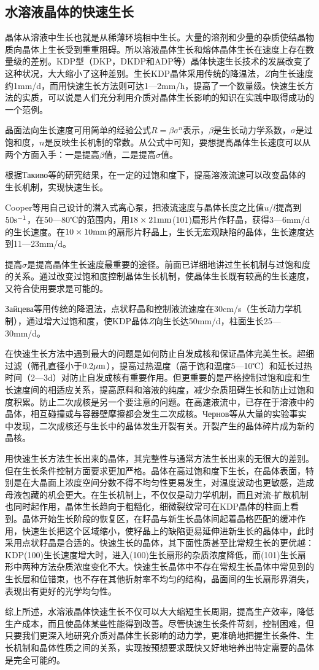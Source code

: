 \subsection{水溶液晶体的快速生长}
晶体从溶液中生长也就是从稀薄环境相中生长。大量的溶剂和少量的杂质使结晶物质向晶体上生长受到重重阻碍。所以溶液晶体生长和熔体晶体生长在速度上存在数量级的差别。KDP型（DKP，DKDP和ADP等）晶体快速生长技术的发展改变了这种状况，大大缩小了这种差别。生长KDP晶体采用传统的降温法，$Z$向生长速度约1mm/d，而用快速生长方法则可达1---2mm/h，提高了一个数量级。快速生长方法的实质，可以说是人们充分利用介质对晶体生长影响的知识在实践中取得成功的一个范例。

晶面法向生长速度可用简单的经验公式$R=\beta\sigma^n$表示，$\beta$是生长动力学系数，$\sigma$是过饱和度，$n$是反映生长机制的常数。从公式中可知，要想提高晶体生长速度可以从两个方面入手：一是提高$\beta$值，二是提高$\sigma$值。

根据{\timesnewroman Такиво}等的研究结果，在一定的过饱和度下，提高溶液流速可以改变晶体的生长机制，实现快速生长。

Cooper等用自己设计的潜入式离心泵，把液流速度与晶体长度之比值$u/l$提高到$\rm 50s^{-1}$，在50---80℃的范围内，用$\rm 18\times 21mm$(101)扇形片作籽晶，获得3---6mm/d的生长速度。在$10\times10\rm mm$的扇形片籽晶上，生长无宏观缺陷的晶体，生长速度达到11---23mm/d。

提高$\sigma$是提高晶体生长速度最重要的途径。前面已详细地讲过生长机制与过饱和度的关系。通过改变过饱和度控制晶体生长机制，使晶体生长既有较高的生长速度，又符合使用要求是可能的。

{\timesnewroman Зайцева}等用传统的降温法，点状籽晶和控制液流速度在30cm/s（生长动力学机制），通过增大过饱和度，使KDP晶体$Z$向生长达50mm/d，柱面生长25---30mm/d。

在快速生长方法中遇到最大的问题是如何防止自发成核和保证晶体完美生长。超细过滤（筛孔直径小于$0.2\rm\mu m$），提高过热温度（高于饱和温度5---10℃）和延长过热时间（2---3d）对防止自发成核有重要作用。但更重要的是严格控制过饱和度和生长速度间的相适应关系，提高原料和溶液的纯度，减少杂质阻碍生长和防止过饱和度积累。防止二次成核是另一个要注意的问题。在高速液流中，已存在于溶液中的晶体，相互碰撞或与容器壁摩擦都会发生二次成核。{\timesnewroman Чернов}等从大量的实验事实中发现，二次成核还与生长中的晶体发生开裂有关。开裂产生的晶体碎片成为新的晶核。

用快速生长方法生长出来的晶体，其完整性与通常方法生长出来的无很大的差别。但在生长条件控制方面要求更加严格。晶体在高过饱和度下生长，在晶体表面，特别是在大晶面上浓度空间分数不得不均匀性更易发生，对温度波动也更敏感，造成母液包藏的机会更大。在生长机制上，不仅仅是动力学机制，而且对流-扩散机制也同时起作用，晶体生长趋向于粗糙化，细微裂纹常可在KDP晶体的柱面上看到。晶体开始生长阶段的恢复区，在籽晶与新生长晶体间起着晶格匹配的缓冲作用，快速生长把这个区域缩小，使籽晶上的缺陷更易延伸进新生长的晶体中，此时采用点状籽晶是合适的。快速生长的晶体，其下面性质甚至比常规生长的更优越：KDP(100)生长速度增大时，进入(100)生长扇形的杂质浓度降低，而(101)生长扇形中两种方法杂质浓度变化不大。快速生长晶体中不存在常规生长晶体中常见到的生长层和位错束，也不存在其他折射率不均匀的结构，晶面间的生长扇形界消失，表现出有更好的光学均匀性。

综上所述，水溶液晶体快速生长不仅可以大大缩短生长周期，提高生产效率，降低生产成本，而且使晶体某些性能得到改善。尽管快速生长条件苛刻，控制困难，但只要我们更深入地研究介质对晶体生长影响的动力学，更准确地把握生长条件、生长机制和晶体性质之间的关系，实现按预想要求既快又好地培养出特定需要的晶体是完全可能的。